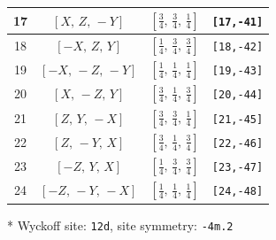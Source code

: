 \documentclass[fleqn,8pt]{jsarticle}
\begin{document}
\begin{longtable}{cccc}
17 & $\left[ X,\, Z,\, - Y \right]$ & $\left[ \frac{3}{4},\, \frac{3}{4},\, \frac{1}{4} \right]$ & {\tt [17,-41]} \\ \hline
18 & $\left[ - X,\, Z,\, Y \right]$ & $\left[ \frac{1}{4},\, \frac{3}{4},\, \frac{3}{4} \right]$ & {\tt [18,-42]} \\ \hline
19 & $\left[ - X,\, - Z,\, - Y \right]$ & $\left[ \frac{1}{4},\, \frac{1}{4},\, \frac{1}{4} \right]$ & {\tt [19,-43]} \\ \hline
20 & $\left[ X,\, - Z,\, Y \right]$ & $\left[ \frac{3}{4},\, \frac{1}{4},\, \frac{3}{4} \right]$ & {\tt [20,-44]} \\ \hline
21 & $\left[ Z,\, Y,\, - X \right]$ & $\left[ \frac{3}{4},\, \frac{3}{4},\, \frac{1}{4} \right]$ & {\tt [21,-45]} \\ \hline
22 & $\left[ Z,\, - Y,\, X \right]$ & $\left[ \frac{3}{4},\, \frac{1}{4},\, \frac{3}{4} \right]$ & {\tt [22,-46]} \\ \hline
23 & $\left[ - Z,\, Y,\, X \right]$ & $\left[ \frac{1}{4},\, \frac{3}{4},\, \frac{3}{4} \right]$ & {\tt [23,-47]} \\ \hline
24 & $\left[ - Z,\, - Y,\, - X \right]$ & $\left[ \frac{1}{4},\, \frac{1}{4},\, \frac{1}{4} \right]$ & {\tt [24,-48]} \\
\end{longtable}
* Wyckoff site: {\tt 12d}, site symmetry: {\tt -4m.2}
\renewcommand{\arraystretch}{1.2}
\end{document}
